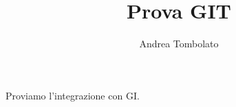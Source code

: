 \documentclass[10pt,a4paper]{article}
\author{Andrea Tombolato}
\title{Prova GIT}
\begin{document}
	Proviamo l'integrazione con GI.
\end{document}
